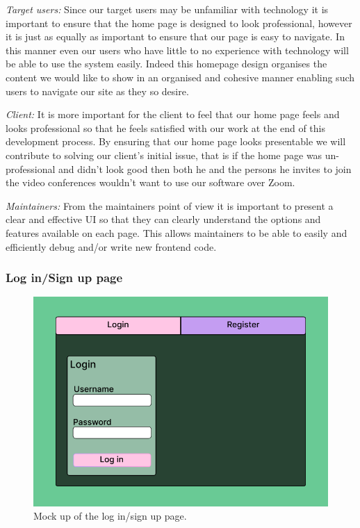 \textit{Target users:} Since
our target users may be unfamiliar with technology it is
important to ensure that the home page is designed to look
professional, however it is just as equally as important to
ensure that our page is easy to navigate. In this manner
even our users who have little to no experience with
technology will be able to use the system easily. Indeed
this homepage design organises the content we would like to
show in an organised and cohesive manner enabling such users
to navigate our site as they so desire. \\ \vspace{0.2cm}

\textit{Client:} It is more important for the client to
feel that our home page feels and looks professional so
that he feels satisfied with our work at the end of this
development process. By ensuring that our home page looks
presentable we will contribute to solving our client's
initial issue, that is if the home page was un-professional
and didn't look good then both he and the persons he invites
to join the video conferences wouldn't want to use our
software over Zoom. \\ \vspace{0.2cm}

\textit{Maintainers:} From the maintainers point of view it
is important to present a clear and effective UI so that
they can clearly understand the options and features
available on each page. This allows maintainers to be able
to easily and efficiently debug and/or write new frontend
code.

\subsubsection{Log in/Sign up page}

\begin{figure}[H]
\centering

\includegraphics[scale=0.2]{Images/Login_Page_1.png}

\caption{Mock up of the log in/sign up page.}
\label{fig:login}
\end{figure}

